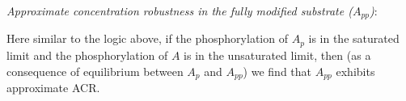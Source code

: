 \documentclass[9pt,lineno]{elife}
\begin{document}
\begin{appendixbox}



\textit{Approximate concentration robustness in the fully modified substrate ($A_{pp}$)}: 

Here similar to the logic above, if the phosphorylation of $A_p$ is in the saturated limit and the phosphorylation of $A$ is in the unsaturated limit, then (as a consequence of equilibrium between $A_p$ and $A_{pp}$) we find that $A_{pp}$ exhibits approximate ACR. 




\end{appendixbox}
\end{document}
